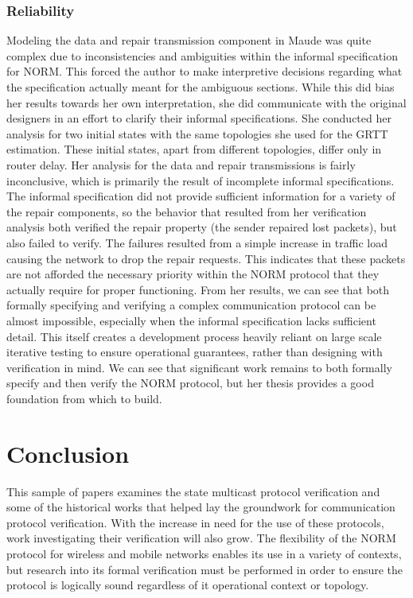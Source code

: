 \documentclass[10pt, journal]{IEEEtran}
\begin{document}
\subsubsection{Reliability}
Modeling the data and repair transmission component in Maude was quite complex due to inconsistencies and ambiguities within the informal specification for NORM. This forced the author to make interpretive decisions regarding what the specification actually meant for the ambiguous sections. While this did bias her results towards her own interpretation, she did communicate with the original designers in an effort to clarify their informal specifications. She conducted her analysis for two initial states with the same topologies she used for the GRTT estimation. These initial states, apart from different topologies, differ only in router delay.
\bigbreak
Her analysis for the data and repair transmissions is fairly inconclusive, which is primarily the result of incomplete informal specifications. The informal specification did not provide sufficient information for a variety of the repair components, so the behavior that resulted from her verification analysis both verified the repair property (the sender repaired lost packets), but also failed to verify. The failures resulted from a simple increase in traffic load causing the network to drop the repair requests. This indicates that these packets are not afforded the necessary priority within the NORM protocol that they actually require for proper functioning.
\bigbreak
From her results, we can see that both formally specifying and verifying a complex communication protocol can be almost impossible, especially when the informal specification lacks sufficient detail. This itself creates a development process heavily reliant on large scale iterative testing to ensure operational guarantees, rather than designing with verification in mind. We can see that significant work remains to both formally specify and then verify the NORM protocol, but her thesis provides a good foundation from which to build.
\bigbreak
\section{Conclusion}
This sample of papers examines the state multicast protocol verification and some of the historical works that helped lay the groundwork for communication protocol verification. With the increase in need for the use of these protocols, work investigating their verification will also grow. The flexibility of the NORM protocol for wireless and mobile networks enables its use in a variety of contexts, but research into its formal verification must be performed in order to ensure the protocol is logically sound regardless of it operational context or topology. 


\end{document}
